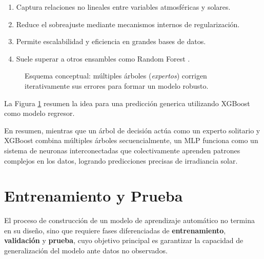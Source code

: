 \begin{enumerate}
\item Captura relaciones no lineales entre variables atmosféricas y solares.
\item Reduce el sobreajuste mediante mecanismos internos de regularización.
\item Permite escalabilidad y eficiencia en grandes bases de datos.
\item Suele superar a otros ensambles como Random Forest \cite{espinoza2020aplicacion}.
\end{enumerate}

\begin{figure}[H] 
\centering 
{} \caption{Esquema conceptual: múltiples árboles (\textit{expertos}) corrigen iterativamente sus errores para formar un modelo robusto.} \label{fig:esquemaxgb} \end{figure}


La Figura \ref{fig:esquemaxgb} resumen la idea para una predicción generica utilizando XGBoost como modelo regresor.


En resumen, mientras que un árbol de decisión actúa como un experto solitario y XGBoost combina múltiples árboles secuencialmente, un MLP funciona como un sistema de neuronas interconectadas que colectivamente aprenden patrones complejos en los datos, logrando predicciones precisas de irradiancia solar.



\section{Entrenamiento y Prueba}

El proceso de construcción de un modelo de aprendizaje automático no termina en su diseño, sino que requiere fases diferenciadas de \textbf{entrenamiento}, \textbf{validación} y \textbf{prueba}, cuyo objetivo principal es garantizar la capacidad de generalización del modelo ante datos no observados.

